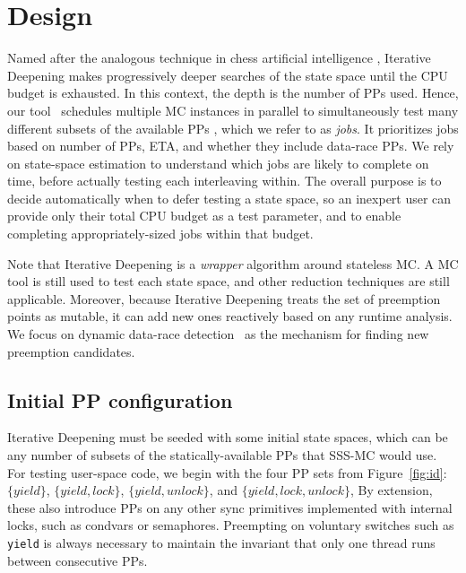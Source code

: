 \section{Design}
\label{sec:design}

Named after the analogous technique in chess artificial intelligence \cite{iterative-deepening-chess-ai},
Iterative Deepening
makes progressively deeper searches of the state space until the CPU budget is exhausted.
In this context, the depth is the number of PPs used.
Hence, our tool \quicksand~schedules multiple MC instances in parallel to simultaneously test many different subsets of the available PPs
, which we refer to as {\em jobs}.
It prioritizes jobs based on number of PPs, ETA, and whether they include data-race PPs.
We rely on state-space estimation \cite{estimation}
to understand which jobs are likely to complete on time,
before actually testing each interleaving within.
The overall purpose is to decide automatically when to defer testing a state space,
so an inexpert user can provide only their total CPU budget as a test parameter,
and to enable completing appropriately-sized jobs within that budget.

Note that Iterative Deepening is a {\em wrapper} algorithm around stateless MC.
A MC tool is still used to test each state space, and other reduction techniques are still applicable.
Moreover, because Iterative Deepening treats the set of preemption points as mutable,
it can add new ones reactively based on any runtime analysis.
We focus on dynamic data-race detection~\cite{tsan} as the mechanism for finding new preemption candidates.


\subsection{Initial PP configuration}

Iterative Deepening must be seeded with some initial state spaces,
which can be any number of subsets of the statically-available PPs that SSS-MC would use.
For testing user-space code, we begin with the four PP sets from Figure~\ref{fig:id}:
$\{yield\}$,
$\{yield,lock\}$,
$\{yield,unlock\}$,
and $\{yield,lock,unlock\}$,
By extension, these also introduce PPs on any other sync primitives implemented with internal locks,
such as condvars or semaphores.
Preempting on voluntary switches such as {\tt yield} is always necessary to maintain the invariant that only one thread runs between consecutive PPs.

